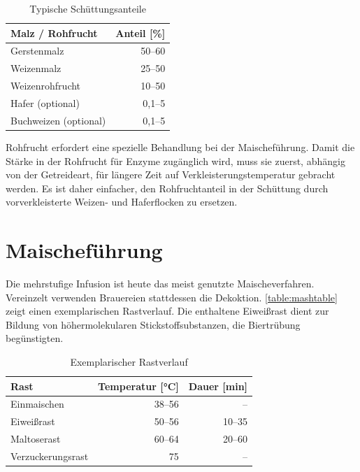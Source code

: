 \documentclass[a4paper,parskip=half]{scrartcl}
\begin{document}
\begin{table}[H]
\centering
\begin{tabular}{lr}
\toprule
Malz / Rohfrucht      & Anteil [\%] \\
\midrule
Gerstenmalz           & 50–60 \\
Weizenmalz            & 25–50 \\
Weizenrohfrucht       & 10–50 \\
Hafer (optional)      & 0,1–5 \\
Buchweizen (optional) & 0,1–5 \\
\bottomrule
\end{tabular}
\caption{Typische Schüttungsanteile \parencite[13]{Strottner1999}}
\label{table:grains}
\end{table}

Rohfrucht erfordert eine spezielle Behandlung bei der Maischeführung. Damit
die Stärke in der Rohfrucht für Enzyme zugänglich wird, muss sie zuerst,
abhängig von der Getreideart, für längere Zeit auf Verkleisterungstemperatur
gebracht werden. Es ist daher einfacher, den Rohfruchtanteil in der Schüttung
durch vorverkleisterte Weizen- und Haferflocken zu ersetzen.

\section*{Maischeführung}

Die mehrstufige Infusion ist heute das meist genutzte Maischeverfahren.
Vereinzelt verwenden Brauereien stattdessen die Dekoktion.  
\autoref{table:mashtable} zeigt einen exemplarischen Rastverlauf. Die enthaltene
Eiweißrast dient zur Bildung von höhermolekularen Stickstoffsubstanzen, die
Biertrübung begünstigten. \parencite[12,16,78]{Strottner1999}

\begin{table}[H]
\centering
\begin{tabular}{lrr}
\toprule
Rast              & Temperatur [°C] & Dauer [min] \\
\midrule
Einmaischen       & 38–56          & –     \\
Eiweißrast        & 50–56          & 10–35 \\
Maltoserast       & 60–64          & 20–60 \\
Verzuckerungsrast & 75             & –     \\
\bottomrule
\end{tabular}
\caption{Exemplarischer Rastverlauf \parencite[16]{Strottner1999}}
\label{table:mashtable}
\end{table}
\end{document}
